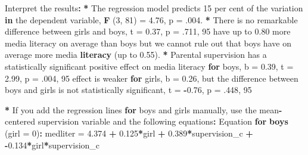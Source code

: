 \documentclass[a4paper]{book}
\newenvironment{Shaded}{\begin{snugshade}}{\end{snugshade}}
\newcommand{\KeywordTok}[1]{\textcolor[rgb]{0,0,0}{\textbf{#1}}}
\newcommand{\DataTypeTok}[1]{\textcolor[rgb]{0,0,0}{#1}}
\newcommand{\DecValTok}[1]{\textcolor[rgb]{0.00,0.00,0.00}{#1}}
\newcommand{\FloatTok}[1]{\textcolor[rgb]{0.00,0.00,0.00}{#1}}
\newcommand{\StringTok}[1]{\textcolor[rgb]{0.00,0.00,0.00}{#1}}
\newcommand{\ControlFlowTok}[1]{\textcolor[rgb]{0.00,0.00,0.00}{\textbf{#1}}}
\newcommand{\OperatorTok}[1]{\textcolor[rgb]{0.00,0.00,0.00}{\textbf{#1}}}
\newcommand{\ErrorTok}[1]{\textcolor[rgb]{0.00,0.00,0.00}{\textbf{#1}}}
\newcommand{\NormalTok}[1]{#1}
\theoremstyle{definition}
\theoremstyle{definition}
\theoremstyle{definition}
\theoremstyle{remark}
\begin{document}
\begin{Shaded}
\begin{Highlighting}[]
\NormalTok{Interpret the results}\OperatorTok{:}\StringTok{  }
\StringTok{  }
\ErrorTok{*}\StringTok{ }\NormalTok{The regression model predicts }\DecValTok{15}\NormalTok{ per cent of the variation }\ControlFlowTok{in}\NormalTok{ the dependent}
\NormalTok{variable, }\KeywordTok{F}\NormalTok{ (}\DecValTok{3}\NormalTok{, }\DecValTok{81}\NormalTok{) =}\StringTok{ }\FloatTok{4.76}\NormalTok{, p =}\StringTok{ }\NormalTok{.}\DecValTok{004}\NormalTok{.}
\OperatorTok{*}\StringTok{ }\NormalTok{There is no remarkable difference between girls and boys, t =}\StringTok{ }\FloatTok{0.37}\NormalTok{, p =}
\NormalTok{.}\DecValTok{711}\NormalTok{, }\DecValTok{95}\NormalTok{%
\NormalTok{have up to }\FloatTok{0.80}\NormalTok{ more media literacy on average than boys but we cannot rule}
\NormalTok{out that boys have on average more media }\KeywordTok{literacy}\NormalTok{ (up to }\FloatTok{0.55}\NormalTok{).}
\OperatorTok{*}\StringTok{ }\NormalTok{Parental supervision has a statistically significant positive effect on}
\NormalTok{media literacy }\ControlFlowTok{for}\NormalTok{ boys, b =}\StringTok{ }\FloatTok{0.39}\NormalTok{, t =}\StringTok{ }\FloatTok{2.99}\NormalTok{, p =}\StringTok{ }\NormalTok{.}\DecValTok{004}\NormalTok{, }\DecValTok{95}\NormalTok{%
\NormalTok{effect is weaker }\ControlFlowTok{for}\NormalTok{ girls, b =}\StringTok{ }\FloatTok{0.26}\NormalTok{, but the difference between boys and girls}
\NormalTok{is not statistically significant, t =}\StringTok{ }\OperatorTok{-}\FloatTok{0.76}\NormalTok{, p =}\StringTok{ }\NormalTok{.}\DecValTok{448}\NormalTok{, }\DecValTok{95}\NormalTok{%

\OperatorTok{*}\StringTok{ }\NormalTok{If you add the regression lines }\ControlFlowTok{for}\NormalTok{ boys and girls manually, use the}
\NormalTok{mean}\OperatorTok{-}\NormalTok{centered supervision variable and the following equations}\OperatorTok{:}
\StringTok{  }
\NormalTok{Equation }\ControlFlowTok{for} \KeywordTok{boys}\NormalTok{ (}\DataTypeTok{girl =} \DecValTok{0}\NormalTok{)}\OperatorTok{:}\StringTok{  }
\StringTok{  }
\NormalTok{medliter =}\StringTok{ }\FloatTok{4.374} \OperatorTok{+}\StringTok{ }\FloatTok{0.125}\OperatorTok{*}\NormalTok{girl }\OperatorTok{+}\StringTok{ }\FloatTok{0.389}\OperatorTok{*}\NormalTok{supervision_c }\OperatorTok{+}\StringTok{ }\OperatorTok{-}\FloatTok{0.134}\OperatorTok{*}\NormalTok{girl}\OperatorTok{*}\NormalTok{supervision_c  }
  
}}}
\end{Highlighting}
\end{Shaded}
\end{document}
